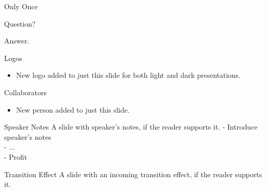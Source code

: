 \documentclass[aspectratio=169,12pt]{beamer}%
\begin{document}
    \begin{frame}{Only Once}
        \onecolumnfull%
        {%
            \begin{itemize}%
                \onlyonce%
                {%
                    \item Question?
                }%
                \onlyonce%
                {%
                    \item Answer.
                }%
            \end{itemize}%
        }%
    \end{frame}

    \begin{frame}{Logos}
        \onecolumnfull%
        {%
            \begin{itemize}
                \item New logo added to just this slide for both light and dark presentations.
            \end{itemize}
        }%
    \end{frame}
    \resetlogos{}

    \begin{frame}{Collaborators}
        \onecolumnfull%
        {%
            \begin{itemize}
                \item New person added to just this slide.
            \end{itemize}
        }%
    \end{frame}
    \clearpeople{}


    \begin{frame}{Speaker Notes}
        \onecolumneven%
        {%
            A slide with speaker's notes, if the reader supports it.
        }%
        \say%
        {%
            - Introduce speaker's notes\\%
            - ...\\%
            - Profit%
        }%
    \end{frame}

    \begin{frame}{Transition Effect}
        \settransitioneffect{\transpush}
        \onecolumneven%
        {%
            A slide with an incoming transition effect, if the reader supports it.
        }%
    \end{frame}
\end{document}
